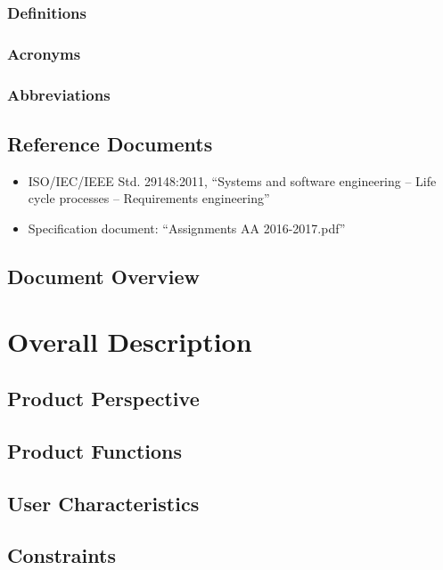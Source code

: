 \documentclass[english]{article}
\begin{document}
\subsubsection{Definitions}

\subsubsection{Acronyms}

\subsubsection{Abbreviations}

\subsection{Reference Documents}

\begin{itemize}
	\item{ISO/IEC/IEEE Std. 29148:2011, “Systems and software engineering -- Life cycle processes -- Requirements engineering”}
	\item{Specification document: “Assignments AA 2016-2017.pdf”}
\end{itemize}

\subsection{Document Overview}

\newpage{}

\section{Overall Description}

\subsection{Product Perspective}

\subsection{Product Functions}

\subsection{User Characteristics}

\subsection{Constraints}
\end{document}
